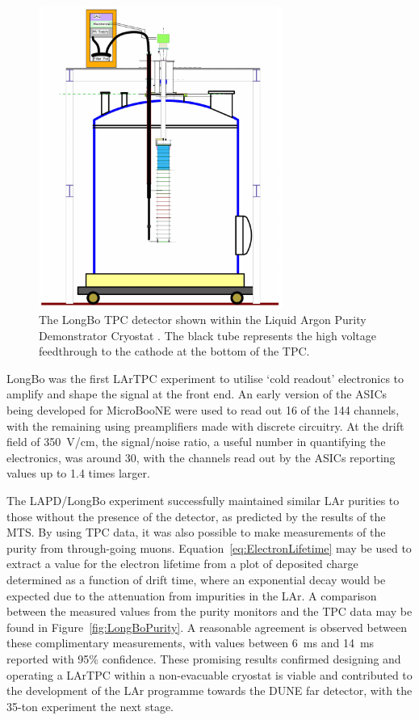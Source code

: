 \begin{figure}
  \centering
  \includegraphics[width=8cm]{LongBo.pdf}
  \caption[The LongBo TPC detector shown within the Liquid Argon Purity Demonstrator Cryostat.]{The LongBo TPC detector shown within the Liquid Argon Purity Demonstrator Cryostat \cite{LongBo2015}.  The black tube represents the high voltage feedthrough to the cathode at the bottom of the TPC.}
  \label{fig:LongBo}
\end{figure}

LongBo was the first LArTPC experiment to utilise `cold readout' electronics to amplify and shape the signal at the front end.  An early version of the ASICs being developed for MicroBooNE were used to read out 16 of the 144 channels, with the remaining using preamplifiers made with discrete circuitry.  At the drift field of 350~V/cm, the signal/noise ratio, a useful number in quantifying the electronics, was around 30, with the channels read out by the ASICs reporting values up to 1.4 times larger.

The LAPD/LongBo experiment successfully maintained similar LAr purities to those without the presence of the detector, as predicted by the results of the MTS.  By using TPC data, it was also possible to make measurements of the purity from through-going muons.  Equation~\ref{eq:ElectronLifetime} may be used to extract a value for the electron lifetime from a plot of deposited charge determined as a function of drift time, where an exponential decay would be expected due to the attenuation from impurities in the LAr.  A comparison between the measured values from the purity monitors and the TPC data may be found in Figure~\ref{fig:LongBoPurity}.  A reasonable agreement is observed between these complimentary measurements, with values between 6~ms and 14~ms reported with 95\% confidence.  These promising results confirmed designing and operating a LArTPC within a non-evacuable cryostat is viable and contributed to the development of the LAr programme towards the DUNE far detector, with the 35-ton experiment the next stage.

